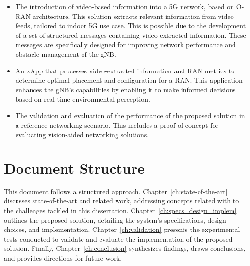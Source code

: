     \begin{itemize}
    
    \item The introduction of video-based information into a 5G network, based on O-RAN architecture.
    This solution extracts relevant information from video feeds, tailored to indoor 5G use case.
    This is possible due to the development of a set of structured messages containing video-extracted information.
    These messages are specifically designed for improving network performance and obstacle management of the gNB\@.
    
    \item An xApp that processes video-extracted information and RAN metrics to determine optimal placement and configuration for a RAN\@.
    This application enhances the gNB's capabilities by enabling it to make informed decisions based on real-time environmental perception.
    
    \item The validation and evaluation of the performance of the proposed solution in a reference networking scenario.
    This includes a proof-of-concept for evaluating vision-aided networking solutions.
    
    \end{itemize}


\section{Document Structure}\label{sec:document-structure}

This document follows a structured approach.
Chapter~\ref{ch:state-of-the-art} discusses state-of-the-art and related work, addressing concepts related with to the challenges tackled in this dissertation.
Chapter~\ref{ch:specs_design_implem} outlines the proposed solution, detailing the system's specifications, design choices, and implementation.
Chapter~\ref{ch:validation} presents the experimental tests conducted to validate and evaluate the implementation of the proposed solution.
Finally, Chapter~\ref{ch:conclusion} synthesizes findings, draws conclusions, and provides directions for future work.